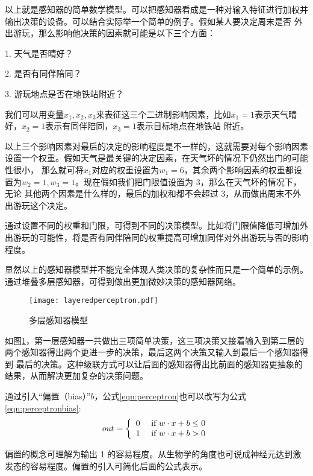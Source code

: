 以上就是感知器的简单数学模型。可以把感知器看成是一种对输入特征进行加权并输出决策的设备。可以结合实际举一个简单的例子。假如某人要决定周末是否
外出游玩，那么影响他决策的因素就可能是以下三个方面：

1. 天气是否晴好？

2. 是否有同伴陪同？

3. 游玩地点是否在地铁站附近？

我们可以用变量$x_1, x_2, x_3$来表征这三个二进制影响因素，比如$x_1 = 1$表示天气晴好，$x_2 = 1$表示有同伴陪同，$x_3 = 1$表示目标地点在地铁站
附近。

以上三个影响因素对最后的决定的影响程度是不一样的，这就需要对每个影响因素设置一个权重。假如天气是最关键的决定因素，在天气坏的情况下仍然出门的可能性很小，
那么就可将$x_1$对应的权重设置为$w_1=6$，其余两个影响因素的权重都设置为$w_2=1, w_3=1$。现在假如我们把门限值设置为 3，那么在天气坏的情况下，无论
其他两个因素是什么样的，最后的加权和都不会超过 3，从而做出周末不外出游玩这个决定。

通过设置不同的权重和门限，可得到不同的决策模型。比如将门限值降低可增加外出游玩的可能性，将是否有同伴陪同的权重提高可增加同伴对外出游玩与否的影响程度。

显然以上的感知器模型并不能完全体现人类决策的复杂性而只是一个简单的示例。通过堆叠多层感知器，可得到做出更加微妙决策的感知器网络。

\begin{figure}[h]
	\texttt{[image: layeredperceptron.pdf]}
	\caption{多层感知器模型}
	\label{layeredperceptron}
\end{figure}

如图\ref{layeredperceptron}，第一层感知器一共做出三项简单决策，这三项决策又接着输入到第二层的两个感知器得出两个更进一步的决策，最后这两个决策又输入到最后一个感知器得到
最后的决策。这种级联方式可以让后面的感知器得出比前面的感知器更抽象的结果，从而解决更加复杂的决策问题。

通过引入“偏置（bias）”$b$，公式\ref{eqn:perceptron}也可以改写为公式\ref{eqn:perceptronbias}:
\begin{equation}
	\label{eqn:perceptronbias}
out = \left\{ \begin{array} { l l } { 0 } & { \text { if } w \cdot x + b \leq 0 } \\ { 1 } & { \text { if } w \cdot x + b > 0 } \end{array} \right.
\end{equation}

偏置的概念可理解为输出 1 的容易程度。从生物学的角度也可说成神经元达到激发态的容易程度。偏置的引入可简化后面的公式表示。

